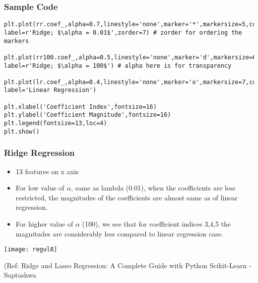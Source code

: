 \begin{frame}[fragile]\frametitle{Sample Code}

\begin{lstlisting}
plt.plot(rr.coef_,alpha=0.7,linestyle='none',marker='*',markersize=5,color='red',
label=r'Ridge; $\alpha = 0.01$',zorder=7) # zorder for ordering the markers

plt.plot(rr100.coef_,alpha=0.5,linestyle='none',marker='d',markersize=6,color='blue',
label=r'Ridge; $\alpha = 100$') # alpha here is for transparency

plt.plot(lr.coef_,alpha=0.4,linestyle='none',marker='o',markersize=7,color='green',
label='Linear Regression')

plt.xlabel('Coefficient Index',fontsize=16)
plt.ylabel('Coefficient Magnitude',fontsize=16)
plt.legend(fontsize=13,loc=4)
plt.show()
\end{lstlisting}

\end{frame}

\begin{frame}[fragile]\frametitle{Ridge Regression}
\begin{itemize}
\item 13 features on x axis
\item For low value of $\alpha$, same as lambda (0.01), when the coefficients are less restricted, the magnitudes of the coefficients are almost same as of linear regression.
\item For higher value of $\alpha$ (100), we see that for coefficient indices 3,4,5 the magnitudes are considerably less compared to linear regression case. 
\end{itemize}

\begin{center}
\texttt{[image: regul8]}
\end{center}

{\tiny (Ref: Ridge and Lasso Regression: A Complete Guide with Python Scikit-Learn - Saptashwa}
\end{frame}




